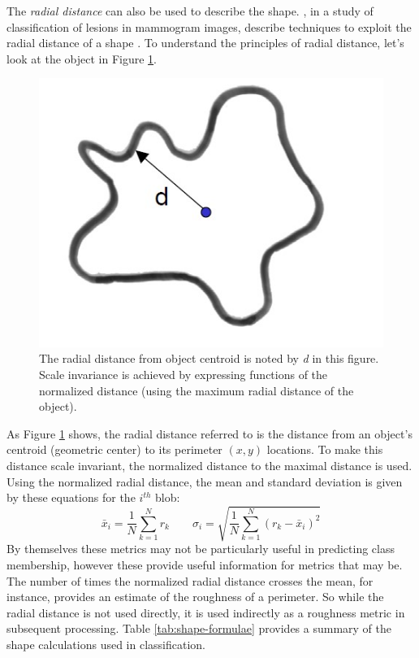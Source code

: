 \documentclass[letterpaper, notitlepage]{report}
\begin{document}
{%


The \textit{radial distance} can also be used to describe the shape. \citeauthor{Kilday1993-aq}, in a study of classification of lesions in mammogram images, describe techniques to exploit the radial distance of a shape \parencite{Kilday1993-aq}. To understand the principles of radial distance, let’s look at the object in Figure \ref{fig:radial-distance}.
\begin{figure}[H]
	\centering
	\includegraphics[width=.25\linewidth]{./figures/radial-distance.jpg}
	\caption[Radial distance from object centroid]{The radial distance from object centroid is noted by \textit{d} in this figure. Scale invariance is achieved by expressing functions of the normalized distance (using the maximum radial distance of the object).}
	\label{fig:radial-distance}	
\end{figure}
As Figure \ref{fig:radial-distance} shows, the radial distance referred to is the distance from an object's centroid (geometric center) to its perimeter $(x,y)$ locations. To make this distance scale invariant, the normalized distance to the maximal distance is used. Using the normalized radial distance, the mean and standard deviation is given by these equations for the $i^{th}$ blob:
\begin{equation}%
\bar{x}_i = \frac{1}{N}\sum_{k=1}^{N}r_k \qquad
\sigma_i = \sqrt{\frac{1}{N}\sum_{k=1}^{N}({r_k} - \bar{x}_i)^2}
\end{equation}
By themselves these metrics may not be particularly useful in predicting class membership, however these provide useful information for metrics that may be. The number of times the normalized radial distance crosses the mean, for instance, provides an estimate of the roughness of a perimeter. So while the radial distance is not used directly, it is used indirectly as a roughness metric in subsequent processing. Table \ref{tab:shape-formulae} provides a summary of the shape calculations used in classification.


}
\end{document}
